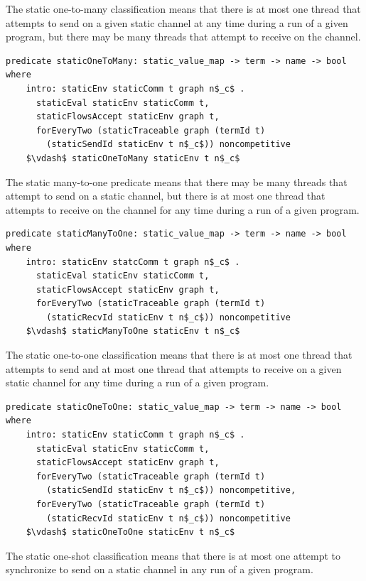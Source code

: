 \documentclass[letterpaper, 11pt]{extarticle}
\begin{document}
The static one-to-many classification means that there is at most one thread that attempts to
send on a given static channel at any time during a run of a given program, but there may be
many threads that attempt to receive on the channel.

\begin{lstlisting}[language=logic, mathescape]
  predicate staticOneToMany: static_value_map -> term -> name -> bool where
    intro: staticEnv staticComm t graph n$_c$ .
      staticEval staticEnv staticComm t,
      staticFlowsAccept staticEnv graph t,
      forEveryTwo (staticTraceable graph (termId t)
        (staticSendId staticEnv t n$_c$)) noncompetitive
    $\vdash$ staticOneToMany staticEnv t n$_c$
\end{lstlisting}

The static many-to-one predicate means
that there may be many threads that attempt to send on a static channel, but there is at most
one thread that attempts to receive on the channel for any time during a run of a given
program.

\begin{lstlisting}[language=logic, mathescape]
  predicate staticManyToOne: static_value_map -> term -> name -> bool where
    intro: staticEnv statcComm t graph n$_c$ .
      staticEval staticEnv staticComm t,
      staticFlowsAccept staticEnv graph t,
      forEveryTwo (staticTraceable graph (termId t)
        (staticRecvId staticEnv t n$_c$)) noncompetitive
    $\vdash$ staticManyToOne staticEnv t n$_c$
\end{lstlisting}

The static one-to-one classification means that there is at most one thread that attempts to
send and at most one thread that attempts to receive on a given static channel for any time
during a run of a given program.

\begin{lstlisting}[language=logic, mathescape]
  predicate staticOneToOne: static_value_map -> term -> name -> bool where
    intro: staticEnv staticComm t graph n$_c$ .
      staticEval staticEnv staticComm t,
      staticFlowsAccept staticEnv graph t,
      forEveryTwo (staticTraceable graph (termId t)
        (staticSendId staticEnv t n$_c$)) noncompetitive, 
      forEveryTwo (staticTraceable graph (termId t)
        (staticRecvId staticEnv t n$_c$)) noncompetitive
    $\vdash$ staticOneToOne staticEnv t n$_c$
\end{lstlisting}

The static one-shot classification means that there is at most one attempt
to synchronize to send on a static channel in any run of a given program.
\end{document}
